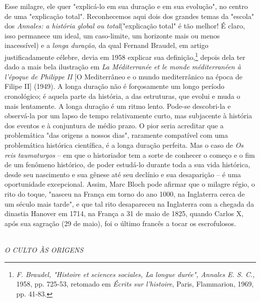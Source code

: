 \documentclass[a5paper]{book}
\begin{document}
Esse milagre, ele quer "explicá-lo em sua duração e em sua evolução", no centro de uma "explicação total". Reconhecemos aqui dois dos grandes temas da "escola" dos \textit{Annales: a história global ou total}("explicação total" é tão melhor! É claro, isso permanece um ideal, um caso-limite, um horizonte mais ou menos inacessível) e a \textit{longa duração}, da qual Fernand Braudel, em artigo justif{\kern0pt}icadamente célebre, devia em 1958 explicar sua def{\kern0pt}inição,\footnote{\textit{F. Braudel, "Histoire et sciences sociales, La longue durée", Annales E. S. C.,} 1958, pp. 725-53, retomado em \textit{Écrits sur l'histoire}, Paris, Flammarion, 1969, pp. 41-83.} depois dela ter dado a mais bela ilustração em \textit{La Méditerranée et le monde méditerranéen à l'époque de Philippe II} [O Mediterrâneo e o mundo mediterrânico na época de Filipe II] (1949). A longa duração não é forçosamente um longo período cronológico; é aquela parte da história, a das estruturas, que evolui e muda o mais lentamente. A longa duração é um ritmo lento. Pode-se descobri-la e observá-la por um lapso de tempo relativamente curto, mas subjacente à história dos eventos e à conjuntura de médio prazo. O pior seria acreditar que a problemática "das origens a nossos dias", raramente compatível com uma problemática histórica científ{\kern0pt}ica, é a longa duração perfeita. Mas o caso de \textit{Os reis taumaturgos} -- em que o historiador tem a sorte de conhecer o começo e o f{\kern0pt}im de um fenômeno histórico, de poder estudá-lo durante toda a sua vida histórica, desde seu nascimento e sua gênese até seu declínio e sua desaparição -- é uma oportunidade excepcional. Assim, Marc Bloch pode af{\kern0pt}irmar que o milagre régio, o rito do toque, "nasceu na França em torno do ano 1000, na Inglaterra cerca de um século mais tarde", e que tal rito desapareceu na Inglaterra com a chegada da dinastia Hanover em 1714, na França a 31 de maio de 1825, quando Carlos X, após sua sagração (29 de maio), foi o último francês a tocar os escrofulosos.

~\\ \large \textit{O CULTO ÀS ORIGENS} ~\\
\end{document}
